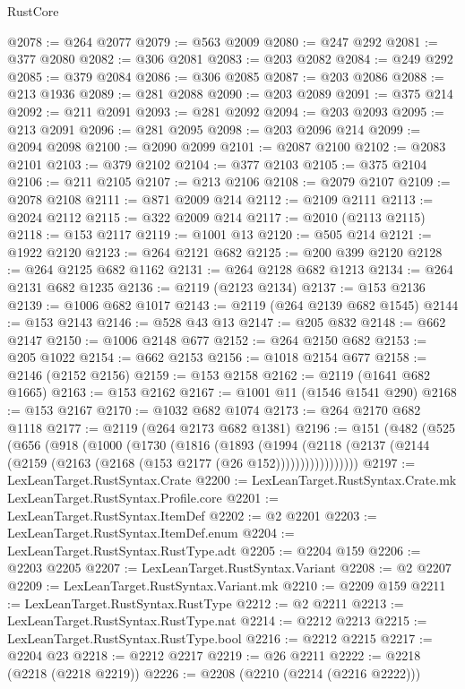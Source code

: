 \begin{lexlean}{RustCore}
\begin{coremodule}
@2078 := @264 @2077
@2079 := @563 @2009
@2080 := @247 @292
@2081 := @377 @2080
@2082 := @306 @2081
@2083 := @203 @2082
@2084 := @249 @292
@2085 := @379 @2084
@2086 := @306 @2085
@2087 := @203 @2086
@2088 := @213 @1936
@2089 := @281 @2088
@2090 := @203 @2089
@2091 := @375 @214
@2092 := @211 @2091
@2093 := @281 @2092
@2094 := @203 @2093
@2095 := @213 @2091
@2096 := @281 @2095
@2098 := @203 @2096 @214
@2099 := @2094 @2098
@2100 := @2090 @2099
@2101 := @2087 @2100
@2102 := @2083 @2101
@2103 := @379 @2102
@2104 := @377 @2103
@2105 := @375 @2104
@2106 := @211 @2105
@2107 := @213 @2106
@2108 := @2079 @2107
@2109 := @2078 @2108
@2111 := @871 @2009 @214
@2112 := @2109 @2111
@2113 := @2024 @2112
@2115 := @322 @2009 @214
@2117 := @2010 (@2113 @2115)
@2118 := @153 @2117
@2119 := @1001 @13
@2120 := @505 @214
@2121 := @1922 @2120
@2123 := @264 @2121 @682
@2125 := @200 @399 @2120
@2128 := @264 @2125 @682 @1162
@2131 := @264 @2128 @682 @1213
@2134 := @264 @2131 @682 @1235
@2136 := @2119 (@2123 @2134)
@2137 := @153 @2136
@2139 := @1006 @682 @1017
@2143 := @2119 (@264 @2139 @682 @1545)
@2144 := @153 @2143
@2146 := @528 @43 @13
@2147 := @205 @832
@2148 := @662 @2147
@2150 := @1006 @2148 @677
@2152 := @264 @2150 @682
@2153 := @205 @1022
@2154 := @662 @2153
@2156 := @1018 @2154 @677
@2158 := @2146 (@2152 @2156)
@2159 := @153 @2158
@2162 := @2119 (@1641 @682 @1665)
@2163 := @153 @2162
@2167 := @1001 @11 (@1546 @1541 @290)
@2168 := @153 @2167
@2170 := @1032 @682 @1074
@2173 := @264 @2170 @682 @1118
@2177 := @2119 (@264 @2173 @682 @1381)
@2196 := @151
    (@482
      (@525
        (@656
          (@918
            (@1000
              (@1730
                (@1816
                  (@1893
                    (@1994
                      (@2118
                        (@2137 (@2144 (@2159 (@2163 (@2168 (@153 @2177 (@26 @152)))))))))))))))))
@2197 := LexLeanTarget.RustSyntax.Crate
@2200 := LexLeanTarget.RustSyntax.Crate.mk LexLeanTarget.RustSyntax.Profile.core
@2201 := LexLeanTarget.RustSyntax.ItemDef
@2202 := @2 @2201
@2203 := LexLeanTarget.RustSyntax.ItemDef.enum
@2204 := LexLeanTarget.RustSyntax.RustType.adt
@2205 := @2204 @159
@2206 := @2203 @2205
@2207 := LexLeanTarget.RustSyntax.Variant
@2208 := @2 @2207
@2209 := LexLeanTarget.RustSyntax.Variant.mk
@2210 := @2209 @159
@2211 := LexLeanTarget.RustSyntax.RustType
@2212 := @2 @2211
@2213 := LexLeanTarget.RustSyntax.RustType.nat
@2214 := @2212 @2213
@2215 := LexLeanTarget.RustSyntax.RustType.bool
@2216 := @2212 @2215
@2217 := @2204 @23
@2218 := @2212 @2217
@2219 := @26 @2211
@2222 := @2218 (@2218 (@2218 @2219))
@2226 := @2208 (@2210 (@2214 (@2216 @2222)))

\end{coremodule}
\end{lexlean}
